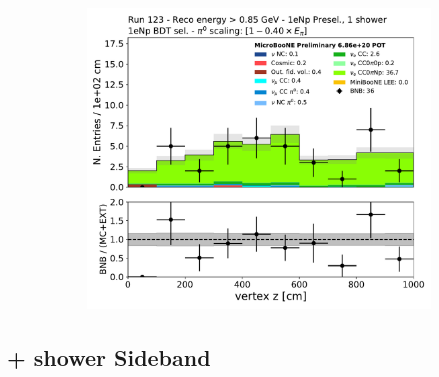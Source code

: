 \begin{figure}[H]
\begin{subfigure}{0.3\textwidth}
    \caption{}
    \end{subfigure}
    \begin{subfigure}{0.3\textwidth}
    \includegraphics[width=1.0\textwidth]{Sidebands/Figures/1eNp/HighEnergy/HiEext_NPOneShr_NPBDT_pi0e040/reco_nu_vtx_z.pdf}
    \caption{}
    \end{subfigure}
    \caption{} 
    \label{fig:HE_1eNp_11}
\end{figure}

\subsection{+ shower Sideband}
\label{app:sideband:1e0ptwoplusshower}
